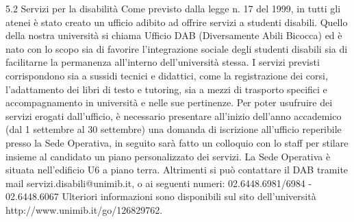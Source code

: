 5.2 Servizi per la disabilità 
Come previsto dalla legge n. 17 del 1999, in tutti gli atenei è stato creato un ufficio adibito ad offrire servizi a studenti disabili. Quello della nostra università si chiama Ufficio DAB (Diversamente Abili Bicocca) ed è nato con lo scopo sia di favorire l'integrazione sociale degli studenti disabili sia di facilitarne la permanenza all'interno dell'università stessa. 
I servizi previsti corrispondono sia a sussidi tecnici e didattici, come la registrazione dei corsi, l'adattamento dei libri di testo e tutoring, sia a mezzi di trasporto specifici e accompagnamento in università e nelle sue pertinenze. Per poter usufruire dei servizi erogati dall'ufficio, è necessario presentare all'inizio dell'anno accademico (dal 1 settembre al 30 settembre) una domanda di iscrizione all'ufficio reperibile presso la Sede Operativa, in seguito sarà fatto un colloquio con lo staff per stilare insieme al candidato un piano personalizzato dei servizi. 
La Sede Operativa è situata nell'edificio U6 a piano terra. Altrimenti si può contattare il DAB tramite mail  servizi.disabili@unimib.it, o ai seguenti numeri: 02.6448.6981/6984 - 02.6448.6067 
Ulteriori informazioni sono disponibili sul sito dell'università http://www.unimib.it/go/126829762.
